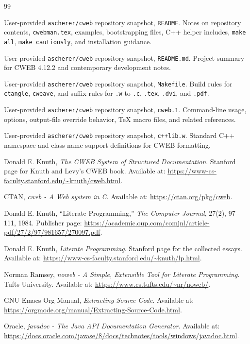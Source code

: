 \documentclass[11pt]{article}
\begin{document}
\begin{thebibliography}{99}

User-provided \texttt{ascherer/cweb} repository snapshot, \texttt{README}. Notes on repository contents, \texttt{cwebman.tex}, examples, bootstrapping files, C++ helper includes, \texttt{make all}, \texttt{make cautiously}, and installation guidance.

User-provided \texttt{ascherer/cweb} repository snapshot, \texttt{README.md}. Project summary for CWEB 4.12.2 and contemporary development notes.

User-provided \texttt{ascherer/cweb} repository snapshot, \texttt{Makefile}. Build rules for \texttt{ctangle}, \texttt{cweave}, and suffix rules for \texttt{.w} to \texttt{.c}, \texttt{.tex}, \texttt{.dvi}, and \texttt{.pdf}.

User-provided \texttt{ascherer/cweb} repository snapshot, \texttt{cweb.1}. Command-line usage, options, output-file override behavior, TeX macro files, and related references.

User-provided \texttt{ascherer/cweb} repository snapshot, \texttt{c++lib.w}. Standard C++ namespace and class-name support definitions for CWEB formatting.

Donald E. Knuth, \emph{The CWEB System of Structured Documentation}. Stanford page for Knuth and Levy's CWEB book. Available at: \url{https://www-cs-faculty.stanford.edu/~knuth/cweb.html}.

CTAN, \emph{cweb - A Web system in C}. Available at: \url{https://ctan.org/pkg/cweb}.

Donald E. Knuth, ``Literate Programming,'' \emph{The Computer Journal}, 27(2), 97--111, 1984. Publisher page: \url{https://academic.oup.com/comjnl/article-pdf/27/2/97/981657/270097.pdf}.

Donald E. Knuth, \emph{Literate Programming}. Stanford page for the collected essays. Available at: \url{https://www-cs-faculty.stanford.edu/~knuth/lp.html}.

Norman Ramsey, \emph{noweb - A Simple, Extensible Tool for Literate Programming}. Tufts University. Available at: \url{https://www.cs.tufts.edu/~nr/noweb/}.

GNU Emacs Org Manual, \emph{Extracting Source Code}. Available at: \url{https://orgmode.org/manual/Extracting-Source-Code.html}.

Oracle, \emph{javadoc - The Java API Documentation Generator}. Available at: \url{https://docs.oracle.com/javase/8/docs/technotes/tools/windows/javadoc.html}.

\end{thebibliography}
\end{document}
